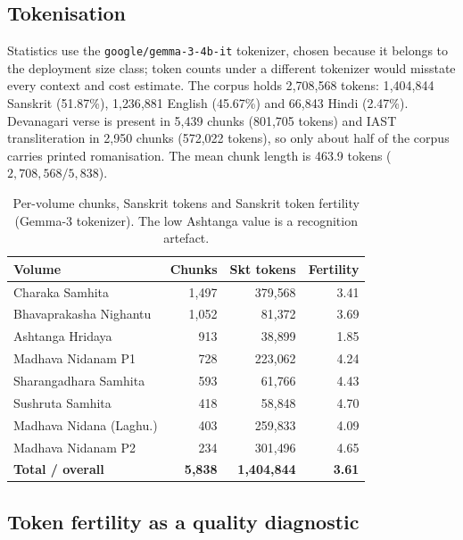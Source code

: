 \documentclass[10pt,twocolumn,letterpaper]{article}
\begin{document}
\subsection{Tokenisation}

Statistics use the \texttt{google/gemma-3-4b-it} tokenizer, chosen because it
belongs to the deployment size class; token counts under a different tokenizer
would misstate every context and cost estimate. The corpus holds 2{,}708{,}568
tokens: 1{,}404{,}844 Sanskrit (51.87\%), 1{,}236{,}881 English (45.67\%) and
66{,}843 Hindi (2.47\%). Devanagari verse is present in 5{,}439 chunks (801{,}705
tokens) and IAST transliteration in 2{,}950 chunks (572{,}022 tokens), so only
about half of the corpus carries printed romanisation. The mean chunk length is
463.9 tokens ($2{,}708{,}568 / 5{,}838$).

\begin{table}[t]
\centering
\small
\setlength{\tabcolsep}{4pt}
\begin{tabular}{@{}lrrr@{}}
\toprule
\textbf{Volume} & \textbf{Chunks} & \textbf{Skt tokens} & \textbf{Fertility} \\
\midrule
Charaka Samhita          & 1{,}497 & 379{,}568 & 3.41 \\
Bhavaprakasha Nighantu   & 1{,}052 & 81{,}372  & 3.69 \\
Ashtanga Hridaya         & 913     & 38{,}899  & 1.85 \\
Madhava Nidanam P1       & 728     & 223{,}062 & 4.24 \\
Sharangadhara Samhita    & 593     & 61{,}766  & 4.43 \\
Sushruta Samhita         & 418     & 58{,}848  & 4.70 \\
Madhava Nidana (Laghu.)  & 403     & 259{,}833 & 4.09 \\
Madhava Nidanam P2       & 234     & 301{,}496 & 4.65 \\
\midrule
\textbf{Total / overall} & \textbf{5{,}838} & \textbf{1{,}404{,}844} & \textbf{3.61} \\
\bottomrule
\end{tabular}
\caption{Per-volume chunks, Sanskrit tokens and Sanskrit token fertility (Gemma-3
tokenizer). The low Ashtanga value is a recognition artefact.}
\label{tab:corpus}
\end{table}

\subsection{Token fertility as a quality diagnostic}
\end{document}
